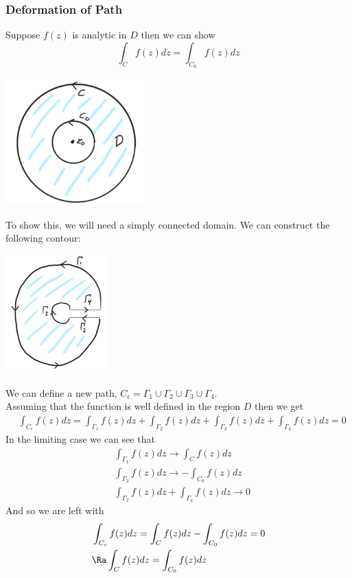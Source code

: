 \subsubsection{Deformation of Path}
Suppose $f(z)$ is analytic in $D$ then we can show
\[\int_C f(z)dz=\int_{C_0}f(z)dz\]
\centerline{\includegraphics[width=0.4\textwidth]{Images/ComplexAnalysisPictures/DeformationOfPath.png}}
To show this, we will need a simply connected domain. We can construct the following contour:\\
\centerline{\includegraphics[width=0.3\textwidth]{Images/ComplexAnalysisPictures/SimplyConnectedDomain.png}}
We can define a new path, $C_\epsilon=\Gamma_1\cup\Gamma_2\cup\Gamma_3\cup\Gamma_4$.\\
Assuming that the function is well defined in the region $D$ then we get
\begin{align*}
    &\int_{C_\epsilon}f(z)dz=\int_{\Gamma_1}f(z)dz+\int_{\Gamma_2}f(z)dz+\int_{\Gamma_3}f(z)dz+\int_{\Gamma_4}f(z)dz=0
\end{align*}
In the limiting case we can see that
\begin{align*}
    &\int_{\Gamma_1}f(z)dz\to\int_{C}f(z)dz\\
    &\int_{\Gamma_3}f(z)dz\to-\int_{C_0}f(z)dz\\
    &\int_{\Gamma_2}f(z)dz+\int_{\Gamma_4}f(z)dz\to0
\end{align*}
And so we are left with
\begin{align*}
    &\int_{C_\epsilon}f(z)dz=\int_Cf(z)dz-\int_{C_0}f(z)dz=0\\
    &\Ra \int_Cf(z)dz=\int_{C_0}f(z)dz
\end{align*}
